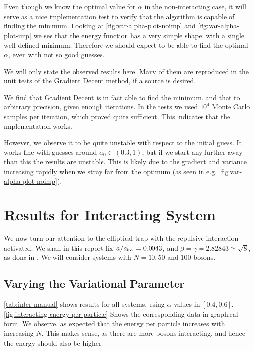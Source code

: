 \documentclass[twocolumn]{article}
\begin{document}
Even though we know the optimal value for $\alpha$ in the non-interacting case,
it will serve as a nice implementation test to verify that the algorithm is
capable of finding the minimum. Looking at \autoref{fig:var-alpha-plot-noimp}
and \ref{fig:var-alpha-plot-imp} we see that the energy function has a very
simple shape, with a single well defined minimum. Therefore we should expect to
be able to find the optimal $\alpha$, even with not so good guesses.

We will only state the observed results here. Many of them are reproduced in the
unit tests of the Gradient Decent method, if a source is desired.

We find that Gradient Decent is in fact able to find the minimum, and that to
arbitrary precision, given enough iterations. In the tests we used $10^4$ Monte
Carlo samples per iteration, which proved quite sufficient. This indicates that the
implementation works. 

However, we observe it to be quite unstable with respect to the initial guess.
It works fine with guesses around $\alpha_0\in (0.3, 1)$, but if we start any
further away than this the results are unstable. This is likely due to the
gradient and variance increasing rapidly when we stray far from the optimum (as
seen in e.g. \autoref{fig:var-alpha-plot-noimp}). 

\section{Results for Interacting System}

We now turn our attention to the elliptical trap with the repulsive interaction
activated. We shall in this report fix $\flatfrac{a}{a_{ho}}=0.0043$, and
$\beta=\gamma=2.82843\simeq\sqrt{8}$, as done in \cite{DuBois-phys-rev,
Nilsen-phys-rev}. We will consider systems with $N=10, 50$ and $100$ bosons.


\subsection{Varying the Variational Parameter}

\autoref{tab:inter-manual} shows results for all systems, using $\alpha$ values
in $[0.4, 0.6]$. \autoref{fig:interacting-energy-per-particle} Shows the
corresponding data in graphical form. We observe, as expected that the energy
per particle increases with increasing $N$. This makes sense, as there are more
bosons interacting, and hence the energy should also be higher. 
\end{document}
